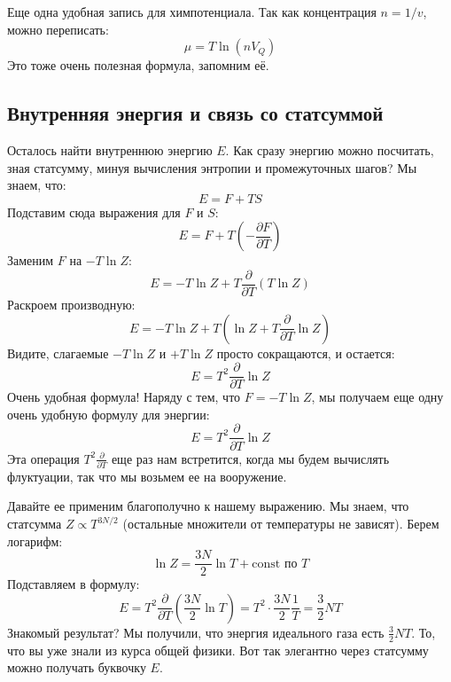 \documentclass[../general/general]{subfiles}
\begin{document}
Еще одна удобная запись для химпотенциала. Так как концентрация $n = 1/v$, можно переписать:
\begin{equation}
    \mu = T \ln (n V_Q)
\end{equation}
Это тоже очень полезная формула, запомним её.

\subsection{Внутренняя энергия и связь со статсуммой}

Осталось найти внутреннюю энергию $E$. Как сразу энергию можно посчитать, зная статсумму, минуя вычисления энтропии и промежуточных шагов? Мы знаем, что:
\begin{equation}
    E = F + TS
\end{equation}
Подставим сюда выражения для $F$ и $S$:
\begin{equation}
    E = F + T \left( -\frac{\partial F}{\partial T} \right)
\end{equation}
Заменим $F$ на $-T \ln Z$:
\begin{equation}
    E = -T \ln Z + T \frac{\partial}{\partial T} (T \ln Z)
\end{equation}
Раскроем производную:
\begin{equation}
    E = -T \ln Z + T \left( \ln Z + T \frac{\partial}{\partial T} \ln Z \right)
\end{equation}
Видите, слагаемые $-T \ln Z$ и $+T \ln Z$ просто сокращаются, и остается:
\begin{equation}
    E = T^2 \frac{\partial}{\partial T} \ln Z
\end{equation}
Очень удобная формула! Наряду с тем, что $F = -T \ln Z$, мы получаем еще одну очень удобную формулу для энергии:
\begin{equation}
    E = T^2 \frac{\partial}{\partial T} \ln Z
\end{equation}
Эта операция $T^2 \frac{\partial}{\partial T}$ еще раз нам встретится, когда мы будем вычислять флуктуации, так что мы возьмем ее на вооружение. 

Давайте ее применим благополучно к нашему выражению. Мы знаем, что статсумма $Z \propto T^{3N/2}$ (остальные множители от температуры не зависят). 
Берем логарифм:
\begin{equation}
    \ln Z = \frac{3N}{2} \ln T + \text{const по } T
\end{equation}
Подставляем в формулу:
\begin{equation}
    E = T^2 \frac{\partial}{\partial T} \left( \frac{3N}{2} \ln T \right) = T^2 \cdot \frac{3N}{2} \frac{1}{T} = \frac{3}{2} N T
\end{equation}
Знакомый результат? Мы получили, что энергия идеального газа есть $\frac{3}{2}NT$. То, что вы уже знали из курса общей физики. Вот так элегантно через статсумму можно получать буквочку $E$.
\end{document}

